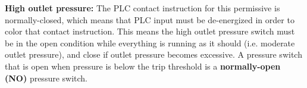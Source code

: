 \vskip 10pt

\noindent
{\bf High outlet pressure:} The PLC contact instruction for this permissive is normally-closed, which means that PLC input must be de-energized in order to color that contact instruction.  This means the high outlet pressure switch must be in the open condition while everything is running as it should (i.e. moderate outlet pressure), and close if outlet pressure becomes excessive.  A pressure switch that is open when pressure is below the trip threshold is a {\bf normally-open (NO)} pressure switch.

\vskip 10pt











